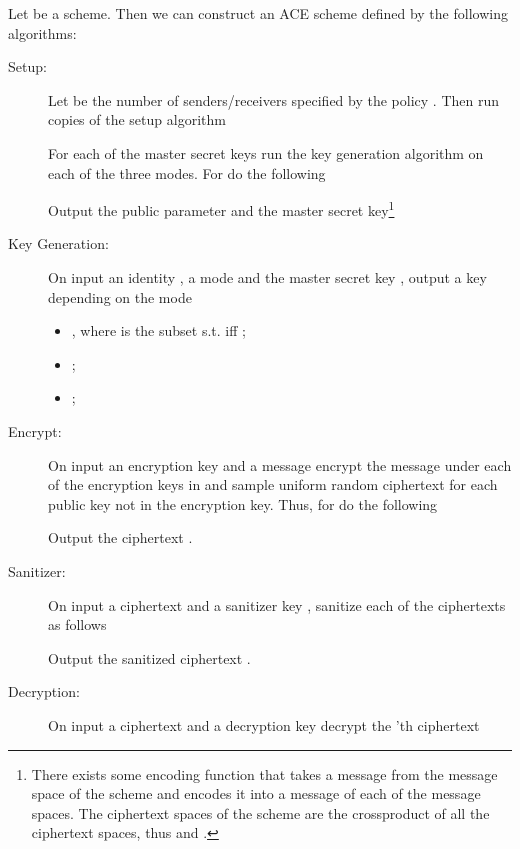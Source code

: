 \documentclass{llncs}
\begin{document}
\begin{construction} \label{con:ACE}
Let  be a \oACE scheme. Then we can construct an ACE scheme  defined by the following algorithms:
\end{construction}
\begin{description}
\item[Setup:] Let  be the number of senders/receivers specified by the policy . Then run  copies of the  setup algorithm

For each of the  master secret keys run the  key generation algorithm on each of the three modes. For  do the following


Output the public parameter and the master secret key\footnote{There exists some encoding function that takes a message  from the message space of the  scheme and encodes it into a message of each of the \oACE message spaces. The ciphertext spaces of the  scheme are the crossproduct of all the \oACE ciphertext spaces, thus  and .}


\item[Key Generation:] On input an identity , a mode  and the master secret key , output a key depending on the mode
	\begin{itemize}
	\item , where  is the subset s.t.  iff ;
	
	\item ;
	
	\item ;
	\end{itemize}

\item[Encrypt:] On input an encryption key  and a message  encrypt the message under each of the  encryption keys in  and sample uniform random ciphertext for each public key not in the encryption key. 
Thus, for  do the following
\begin{itemize}
\item If  then compute .

\item If  then sample  \C_j^\oneACEpowc_j^\oneACEpow \gets_\ is a shorthand for .}
\end{itemize}
Output the ciphertext .


\item[Sanitizer:] On input a ciphertext  and a sanitizer key , sanitize each of the   ciphertexts as follows
 
Output the sanitized ciphertext .

\item[Decryption:] On input a ciphertext  and a decryption key  decrypt the 'th  ciphertext

\end{description}
\end{document}
